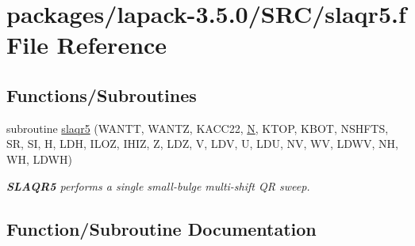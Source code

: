 \hypertarget{slaqr5_8f}{}\section{packages/lapack-\/3.5.0/\+S\+R\+C/slaqr5.f File Reference}
\label{slaqr5_8f}
\subsection*{Functions/\+Subroutines}
\begin{DoxyCompactItemize}
\item 
subroutine \hyperlink{slaqr5_8f_ac3c53fadbc62a707a17ce0d991fae4b0}{slaqr5} (W\+A\+N\+T\+T, W\+A\+N\+T\+Z, K\+A\+C\+C22, \hyperlink{polmisc_8c_a0240ac851181b84ac374872dc5434ee4}{N}, K\+T\+O\+P, K\+B\+O\+T, N\+S\+H\+F\+T\+S, S\+R, S\+I, H, L\+D\+H, I\+L\+O\+Z, I\+H\+I\+Z, Z, L\+D\+Z, V, L\+D\+V, U, L\+D\+U, N\+V, W\+V, L\+D\+W\+V, N\+H, W\+H, L\+D\+W\+H)
\begin{DoxyCompactList}\small\item\em {\bfseries S\+L\+A\+Q\+R5} performs a single small-\/bulge multi-\/shift Q\+R sweep. \end{DoxyCompactList}\end{DoxyCompactItemize}


\subsection{Function/\+Subroutine Documentation}
\hypertarget{slaqr5_8f_ac3c53fadbc62a707a17ce0d991fae4b0}{}
